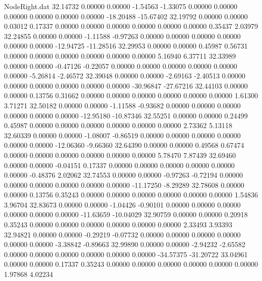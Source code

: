 \begin{filecontents}{NodeRight.dat}
  32.14732    0.00000    0.00000    -1.54563   -1.33075    0.00000    0.00000    0.00000    0.00000    0.00000    0.00000  -18.20488  -15.67402
  32.19792    0.00000    0.00000     0.03012    0.17337    0.00000    0.00000    0.00000    0.00000    0.00000    0.00000    0.35437    2.03979
  32.24855    0.00000    0.00000    -1.11588   -0.97263    0.00000    0.00000    0.00000    0.00000    0.00000    0.00000  -12.94725  -11.28516
  32.29953    0.00000    0.00000     0.45987    0.56731    0.00000    0.00000    0.00000    0.00000    0.00000    0.00000    5.16940    6.37711
  32.33989    0.00000    0.00000    -0.47126   -0.22057    0.00000    0.00000    0.00000    0.00000    0.00000    0.00000   -5.26814   -2.46572
  32.39048    0.00000    0.00000    -2.69163   -2.40513    0.00000    0.00000    0.00000    0.00000    0.00000    0.00000  -30.96847  -27.67216
  32.44103    0.00000    0.00000     0.13756    0.31662    0.00000    0.00000    0.00000    0.00000    0.00000    0.00000    1.61300    3.71271
  32.50182    0.00000    0.00000    -1.11588   -0.93682    0.00000    0.00000    0.00000    0.00000    0.00000    0.00000  -12.95180  -10.87346
  32.55251    0.00000    0.00000     0.24499    0.45987    0.00000    0.00000    0.00000    0.00000    0.00000    0.00000    2.73362    5.13118
  32.60339    0.00000    0.00000    -1.08007   -0.86519    0.00000    0.00000    0.00000    0.00000    0.00000    0.00000  -12.06360   -9.66360
  32.64390    0.00000    0.00000     0.49568    0.67474    0.00000    0.00000    0.00000    0.00000    0.00000    0.00000    5.78470    7.87439
  32.69460    0.00000    0.00000    -0.04151    0.17337    0.00000    0.00000    0.00000    0.00000    0.00000    0.00000   -0.48376    2.02062
  32.74553    0.00000    0.00000    -0.97263   -0.72194    0.00000    0.00000    0.00000    0.00000    0.00000    0.00000  -11.17250   -8.29289
  32.78608    0.00000    0.00000     0.13756    0.35243    0.00000    0.00000    0.00000    0.00000    0.00000    0.00000    1.54836    3.96704
  32.83673    0.00000    0.00000    -1.04426   -0.90101    0.00000    0.00000    0.00000    0.00000    0.00000    0.00000  -11.63659  -10.04029
  32.90759    0.00000    0.00000     0.20918    0.35243    0.00000    0.00000    0.00000    0.00000    0.00000    0.00000    2.33493    3.93393
  32.94821    0.00000    0.00000    -0.29219   -0.07732    0.00000    0.00000    0.00000    0.00000    0.00000    0.00000   -3.38842   -0.89663
  32.99890    0.00000    0.00000    -2.94232   -2.65582    0.00000    0.00000    0.00000    0.00000    0.00000    0.00000  -34.57375  -31.20722
  33.04961    0.00000    0.00000     0.17337    0.35243    0.00000    0.00000    0.00000    0.00000    0.00000    0.00000    1.97868    4.02234

\end{filecontents}
